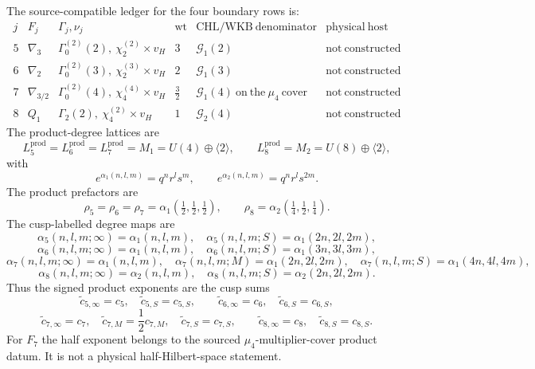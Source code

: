 \begin{theorem}
\label{thm:agent12-f5-f8-ledger}
The source-compatible ledger for the four boundary rows is:
\[
\begin{array}{c|c|c|c|c|c}
j&F_j&\Gamma_j,\nu_j&\mathrm{wt}&\mathrm{CHL/WKB\ denominator}
&\mathrm{physical\ host}\\ \hline
5&\nabla_3&
\Gamma_0^{(2)}(2),\ \chi_2^{(2)}\times v_H
&3&\mathcal G_1(2)&\mathrm{not\ constructed}\\
6&\nabla_2&
\Gamma_0^{(2)}(3),\ \chi_2^{(3)}\times v_H
&2&\mathcal G_1(3)&\mathrm{not\ constructed}\\
7&\nabla_{3/2}&
\Gamma_0^{(2)}(4),\ \chi_4^{(4)}\times v_H
&\frac32&\mathcal G_1(4)\ \mathrm{on\ the\ }\mu_4\mathrm{\ cover}
&\mathrm{not\ constructed}\\
8&Q_1&
\Gamma_2(2),\ \chi_4^{(2)}\times v_H
&1&\mathcal G_2(4)&\mathrm{not\ constructed}
\end{array}
\]
The product-degree lattices are
\[
L^{\mathrm{prod}}_5=L^{\mathrm{prod}}_6=L^{\mathrm{prod}}_7=M_1
=U(4)\oplus\langle2\rangle,\qquad
L^{\mathrm{prod}}_8=M_2=U(8)\oplus\langle2\rangle,
\]
with
\[
e^{\alpha_1(n,l,m)}=q^nr^ls^m,\qquad
e^{\alpha_2(n,l,m)}=q^nr^ls^{2m}.
\]
The product prefactors are
\[
\rho_5=\rho_6=\rho_7=\alpha_1(\tfrac12,\tfrac12,\tfrac12),
\qquad
\rho_8=\alpha_2(\tfrac14,\tfrac12,\tfrac14).
\]
The cusp-labelled degree maps are
\[
\alpha_5(n,l,m;\infty)=\alpha_1(n,l,m),\quad
\alpha_5(n,l,m;S)=\alpha_1(2n,2l,2m),
\]
\[
\alpha_6(n,l,m;\infty)=\alpha_1(n,l,m),\quad
\alpha_6(n,l,m;S)=\alpha_1(3n,3l,3m),
\]
\[
\alpha_7(n,l,m;\infty)=\alpha_1(n,l,m),\quad
\alpha_7(n,l,m;M)=\alpha_1(2n,2l,2m),\quad
\alpha_7(n,l,m;S)=\alpha_1(4n,4l,4m),
\]
\[
\alpha_8(n,l,m;\infty)=\alpha_2(n,l,m),\quad
\alpha_8(n,l,m;S)=\alpha_2(2n,2l,2m).
\]
Thus the signed product exponents are the cusp sums
\[
\widetilde c_{5,\infty}=c_5,\quad
\widetilde c_{5,S}=c_{5,S},\qquad
\widetilde c_{6,\infty}=c_6,\quad
\widetilde c_{6,S}=c_{6,S},
\]
\[
\widetilde c_{7,\infty}=c_7,\quad
\widetilde c_{7,M}=\frac12c_{7,M},\quad
\widetilde c_{7,S}=c_{7,S},\qquad
\widetilde c_{8,\infty}=c_8,\quad
\widetilde c_{8,S}=c_{8,S}.
\]
For \(F_7\) the half exponent belongs to the sourced
\(\mu_4\)-multiplier-cover product datum.  It is not a physical
half-Hilbert-space statement.
\end{theorem}

